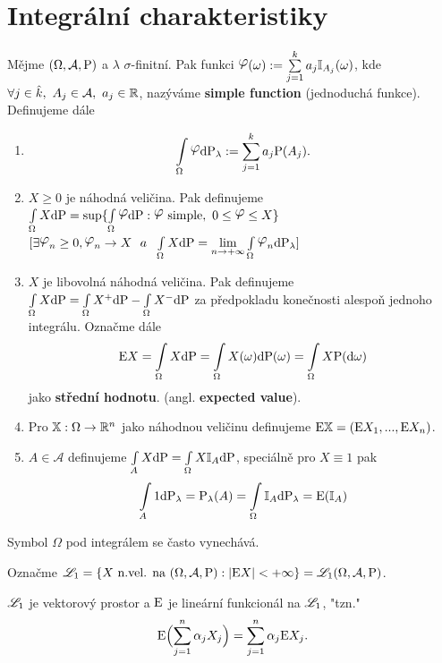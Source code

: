 \section{Integrální charakteristiky}
\begin{define}
	Mějme $(\Omega,\mathcal{A},\mathrm{P})$ a $\lambda$ $\sigma$-finitní. Pak funkci $\lphi(\omega):=\sum\limits_{j=1}^k a_j \mathbb{I}_{A_j}(\omega)$, kde\newline $\forall j\in\hat{k},~A_j\in\mathcal{A},~a_j\in\mathbb{R}$, nazýváme \textbf{simple function} (jednoduchá funkce). Definujeme dále
	\begin{enumerate}
		\item 
		$$ \int\limits_{\Omega} \lphi \dif \PP_\lambda :=\sum\limits_{j=1}^k a_j \PP(A_j). $$
		\item $X\geq 0$ je náhodná veličina. Pak definujeme $\int\limits_\Omega X\dif \PP=\sup\{ \int\limits_\Omega \lphi \dif \PP: \lphi\text{ simple},~0\leq \lphi\leq X \}$ \newline $[\exists \lphi_n\geq 0,\lphi_n \to X~~a~~\int\limits_{\Omega}X\dif \PP=\lim\limits_{n\to+\infty}\int\limits_{\Omega}\lphi_n\dif \PP_\lambda]$
		\item $X$ je libovolná náhodná veličina. Pak definujeme $\int\limits_{\Omega}X\mathrm{d} \mathrm{P}=\int\limits_{\Omega}X^+ \mathrm{d} \mathrm{P}-\int\limits_{\Omega}X^-\mathrm{d} \mathrm{P}$ za předpokladu konečnosti alespoň jednoho integrálu. Označme dále$$\mathrm{E} X=\int\limits_{\Omega}X\mathrm{d} \mathrm{P}=\int\limits_{\Omega}X(\omega )\mathrm{d} \mathrm{P}(\omega)=\int\limits_{\Omega}X\mathrm{P}(\mathrm{d}\omega)$$ jako \textbf{střední hodnotu}. (angl. \textbf{expected value}).
		\item Pro $\mathbb{X}:\Omega\to\mathbb{R}^n$ jako náhodnou veličinu definujeme $\mathrm{E} \mathbb{X}=(\mathrm{E} X_1,...,\mathrm{E} X_n)$.
		\item $A\in\mathcal{A}$ definujeme $\int\limits_{A}X\mathrm{d} \mathrm{P}=\int\limits_{\Omega}X \mathbb{I}_A\mathrm{d} \mathrm{P}$, speciálně pro $X\equiv 1$ pak $$\int\limits_{A}1\mathrm{d} \mathrm{P}_\lambda = \mathrm{P}_\lambda(A)=\int\limits_{\Omega}\mathbb{I}_A\mathrm{d} \mathrm{P}_\lambda=\mathrm{E} (\mathbb{I}_A)$$
	\end{enumerate}
\end{define}	
\begin{remark}
	Symbol $\Omega$ pod integrálem se často vynechává.
\end{remark}
\begin{define}
	Označme $\mathscr{L}_1=\{ X\text{ n.vel. na }(\Omega,\mathcal{A},\mathrm{P}): |\mathrm{E} X|<+\infty \}=\mathscr{L}_1(\Omega,\mathcal{A},\mathrm{P})$.
\end{define}
\begin{theorem}
	$\mathscr{L}_1$ je vektorový prostor a $\mathrm{E} $ je lineární funkcionál na $\mathscr{L}_1$, "tzn." $$\mathrm{E} \Bigl( \sum\limits_{j=1}^n \alpha_jX_j \Bigr)=\sum\limits_{j=1}^n \alpha_j \mathrm{E} X_j.$$
\end{theorem}
